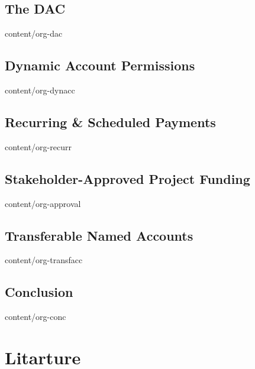 \documentclass[conference,final,10pt,a4paper]{IEEEtran}
\begin{document}
\subsection    { The DAC                                          }  { content/org-dac       } 
\subsection    { Dynamic Account Permissions                      }  { content/org-dynacc    } 
\subsection    { Recurring \& Scheduled Payments                  }  { content/org-recurr    } 
\subsection    { Stakeholder-Approved Project Funding             }  { content/org-approval  } 
\subsection    { Transferable Named Accounts                      }  { content/org-transfacc } 
\subsection    { Conclusion                                       }  { content/org-conc      } 

\section*      { Litarture                                        } 
\end{document}
